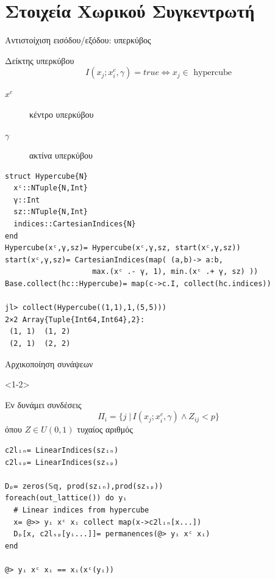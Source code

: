 \documentclass[10pt,lualatex]{beamer}
\begin{document}
\section{Στοιχεία Χωρικού Συγκεντρωτή}

\begin{frame}[fragile]{Αντιστοίχιση εισόδου/εξόδου: υπερκύβος}
\begin{block}{Δείκτης υπερκύβου}
  \[ I(x_j; x_i^c, γ) = \mathit{true} \iff x_j \in \text{ hypercube} \]
  \vspace{-2.2\topsep}
  \begin{description}
    \item[$x^c$] κέντρο υπερκύβου
    \item[$γ$] ακτίνα υπερκύβου
  \end{description}
\end{block}
\pause
\begin{verbatim}
struct Hypercube{N}
  xᶜ::NTuple{N,Int}
  γ::Int
  sz::NTuple{N,Int}
  indices::CartesianIndices{N}
end
Hypercube(xᶜ,γ,sz)= Hypercube(xᶜ,γ,sz, start(xᶜ,γ,sz))
start(xᶜ,γ,sz)= CartesianIndices(map( (a,b)-> a:b,
                    max.(xᶜ .- γ, 1), min.(xᶜ .+ γ, sz) ))
Base.collect(hc::Hypercube)= map(c->c.I, collect(hc.indices))

jl> collect(Hypercube((1,1),1,(5,5)))
2×2 Array{Tuple{Int64,Int64},2}:
 (1, 1)  (1, 2)
 (2, 1)  (2, 2)
\end{verbatim}
\end{frame}

\begin{frame}[fragile]{Αρχικοποίηση συνάψεων}
\begin{onlyenv}<1-2>
\begin{block}{Εν δυνάμει συνδέσεις}
  \[ Π_i= \{j \;|\, I(x_j; x_i^c, γ) \wedge Z_{ij} < p\} \]
  όπου $Ζ \in U(0,1)$ τυχαίος αριθμός
\end{block}
\pause
\begin{verbatim}
c2lᵢₙ= LinearIndices(szᵢₙ)
c2lₛₚ= LinearIndices(szₛₚ)

Dₚ= zeros(𝕊𝕢, prod(szᵢₙ),prod(szₛₚ))
foreach(out_lattice()) do yᵢ
  # Linear indices from hypercube
  x= @>> yᵢ xᶜ xᵢ collect map(x->c2lᵢₙ[x...])
  Dₚ[x, c2lₛₚ[yᵢ...]]= permanences(@> yᵢ xᶜ xᵢ)
end

@> yᵢ xᶜ xᵢ == xᵢ(xᶜ(yᵢ))
\end{verbatim}
\end{onlyenv}

\end{frame}
\end{document}
